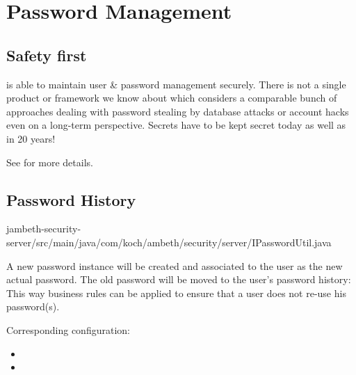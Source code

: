 \section{Password Management}
\label{feature:PasswordManagement}
\ClearAPI
\subsection{Safety first}
\AMBETH is able to maintain user \& password management securely. There is not a single product or framework we know about which considers a comparable bunch of approaches dealing with password stealing by database attacks or account hacks even on a long-term perspective. Secrets have to be kept secret today as well as in 20 years!

See  for more details.

\subsection{Password History}

	{jambeth-security-server/src/main/java/com/koch/ambeth/security/server/IPasswordUtil.java}
	
A new password instance will be created and associated to the user as the new actual password. The old password will be moved to the user's password history: This way business rules can be applied to ensure that a user does not re-use his password(s).

Corresponding configuration:
\begin{itemize}
	\item {}
	\item {}
\end{itemize}